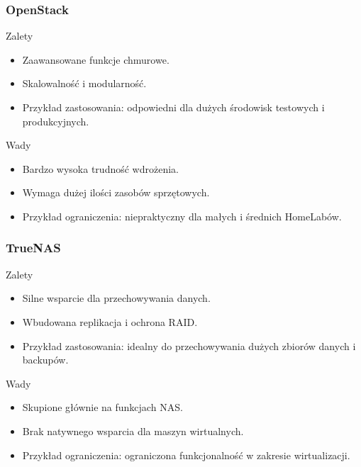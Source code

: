 \subsubsection{OpenStack \cite{OpenStack}}
\begin{minipage}{0.45\textwidth}
    Zalety
    \begin{itemize}
        \item Zaawansowane funkcje chmurowe.
        \item Skalowalność i modularność.
        \item Przykład zastosowania: odpowiedni dla dużych środowisk testowych i produkcyjnych.
    \end{itemize}
\end{minipage}\hfil
\begin{minipage}{0.45\textwidth}
    Wady
    \begin{itemize}
        \item Bardzo wysoka trudność wdrożenia.
        \item Wymaga dużej ilości zasobów sprzętowych.
        \item Przykład ograniczenia: niepraktyczny dla małych i średnich HomeLabów.
    \end{itemize}
\end{minipage}

\subsubsection{TrueNAS \cite{TrueNAS}}
\begin{minipage}{0.45\textwidth}
    Zalety
    \begin{itemize}
        \item Silne wsparcie dla przechowywania danych.
        \item Wbudowana replikacja i ochrona RAID.
        \item Przykład zastosowania: idealny do przechowywania dużych zbiorów danych i backupów.
    \end{itemize}
\end{minipage}\hfil
\begin{minipage}{0.45\textwidth}
    Wady
    \begin{itemize}
        \item Skupione głównie na funkcjach NAS.
        \item Brak natywnego wsparcia dla maszyn wirtualnych.
        \item Przykład ograniczenia: ograniczona funkcjonalność w zakresie wirtualizacji.
    \end{itemize}
\end{minipage}

